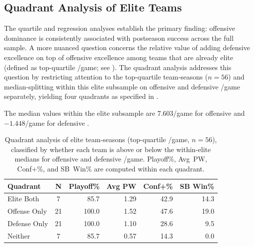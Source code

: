 \subsection{Quadrant Analysis of Elite Teams}
\label{sec:quadrant-findings}

The quartile and regression analyses establish the primary finding: offensive
dominance is consistently associated with postseason success across the full
sample. A more nuanced question concerns the relative value of adding defensive
excellence on top of offensive excellence among teams that are already elite
(defined as top-quartile \gds{}/game; see ).
The quadrant analysis addresses this question by restricting attention to the
top-quartile \gds{} team-seasons ($n = 56$) and median-splitting within this
elite subsample on offensive and defensive \xvoa{}/game separately, yielding
four quadrants as specified in .

The median values within the elite subsample are
$7.603$/game for offensive \xvoa{} and $-1.448$/game for defensive \xvoa{}.

\begin{table}[htbp]
  \centering
  \caption[Quadrant analysis of elite team-seasons]{Quadrant analysis of elite team-seasons (top-quartile
           \gds{}/game, $n = 56$), classified by whether each team is
           above or below the within-elite medians for offensive and
           defensive \xvoa{}/game. Playoff\%, Avg~PW, Conf+\%, and
           SB~Win\% are computed within each quadrant.}
  \label{tab:quadrant-results}
  \begin{tabular}{lcrrrr}
    \toprule
    \textbf{Quadrant} & \textbf{N}
      & \textbf{Playoff\%} & \textbf{Avg PW}
      & \textbf{Conf+\%} & \textbf{SB Win\%} \\
    \midrule
    Elite Both      & \phantom{0}7 & \phantom{0}85.7 & 1.29 & 42.9 & 14.3 \\
    Offense Only    & 21           & 100.0           & 1.52 & 47.6 & 19.0 \\
    Defense Only    & 21           & 100.0           & 1.10 & 28.6 & \phantom{0}9.5 \\
    Neither         & \phantom{0}7 & \phantom{0}85.7 & 0.57 & 14.3 & \phantom{0}0.0 \\
    \bottomrule
  \end{tabular}
\end{table}

